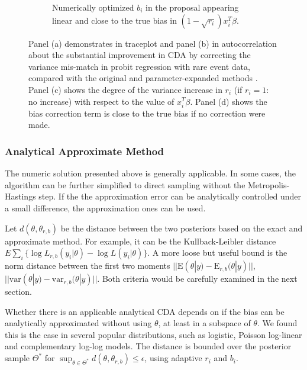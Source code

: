 \documentclass[10pt]{article}
\newcommand{\xbeta}{ x_i^T \beta}
\begin{document}
\begin{figure}[H]
\begin{subfigure}[b]{0.49\textwidth}
  \caption{Numerically optimized $b_i$ in the proposal appearing linear and close to the true bias in $(1-\sqrt{r_i} ) \xbeta$.}
\end{subfigure}
\label{probit_demo}
 \caption{Panel (a) demonstrates in traceplot and panel (b) in autocorrelation about the substantial improvement in CDA by correcting the variance mis-match in probit regression with rare event data, compared with the original \citep{albert1993bayesian} and parameter-expanded methods \citep{liu1999parameter}. Panel (c) shows the degree of the variance increase in $r_i$ (if $r_i=1$: no increase) with respect to the value of $\xbeta$. Panel (d) shows the bias correction term is close to the true bias if no correction were made. }
 \end{figure}
 
\subsubsection{Analytical Approximate Method}

The numeric solution presented above is generally applicable. In some cases, the algorithm can be further simplified to direct sampling without the Metropolis-Hastings step. If the the approximation error can be analytically controlled under a small difference, the approximation ones can be used.

Let $d(\theta, \theta_{r,b})$ be the distance between the two posteriors based on the exact and approximate method. For example, it can be the Kullback-Leibler distance $E\sum_i \{ \log L_{r,b}(y_i | \theta) - \log L(y_i| \theta)\}$. A more loose but useful bound is the norm distance between the first two moments $||\mbox{E}(\theta|y)-\mbox{E}_{r,b}(\theta|y)||$,  $||\mbox{var}(\theta|y)-\mbox{var}_{r,b}(\theta|y)||$. Both criteria would be carefully examined in the next section.

Whether there is an applicable analytical CDA depends on if the bias can be analytically approximated without using $\theta$, at least in a subspace of $\theta$. We found this is the case in several popular distributions, such as logistic, Poisson log-linear and complementary log-log models. The distance is bounded over the posterior sample $\varTheta^*$ for $ \sup_{\theta \in \varTheta^*} d(\theta, \theta_{r,b})\le \epsilon$, using adaptive $r_i$ and $b_i$.
\end{document}
